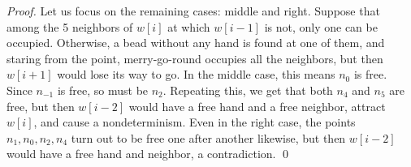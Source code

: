 \begin{proof}
Let us focus on the remaining cases: middle and right. 
Suppose that among the 5 neighbors of $w[i]$ at which $w[i-1]$ is not, only one can be occupied. 
Otherwise, a bead without any hand is found at one of them, and staring from the point, merry-go-round occupies all the neighbors, but then $w[i+1]$ would lose its way to go. 
In the middle case, this means $n_0$ is free. 
Since $n_{-1}$ is free, so must be $n_2$. 
Repeating this, we get that both $n_4$ and $n_5$ are free, but then $w[i-2]$ would have a free hand and a free neighbor, attract $w[i]$, and cause a nondeterminism. 
Even in the right case, the points $n_1, n_0, n_2, n_4$ turn out to be free one after another likewise, but then $w[i-2]$ would have a free hand and neighbor, a contradiction. 
\qed

\end{proof}

